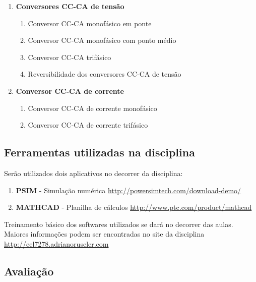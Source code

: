\documentclass[
	article,			%
	12pt,				%
	twoside,			%
	a4paper,			%
	english,			%
	brazil,				%
	sumario=tradicional
]{abntex2-modelo-plano-de-aula}
\begin{document}
\begin{enumerate}
	
	\item\textbf{Conversores CC-CA de tensão}       
	
	\begin{enumerate}
		\item Conversor CC-CA monofásico em ponte
		\item  Conversor CC-CA monofásico com ponto médio
		\item  Conversor CC-CA trifásico
		\item  Reversibilidade dos conversores CC-CA de tensão
	\end{enumerate} 
	
	\item \textbf{Conversor CC-CA de corrente}
	\begin{enumerate}
		\item  Conversor CC-CA de corrente monofásico
		\item  Conversor CC-CA de corrente trifásico
	\end{enumerate}
	
	
	
\end{enumerate} 




\begin{mdframed}[style=mdfexample2]	\center
	\section{Ferramentas utilizadas na disciplina}
\end{mdframed}        

Serão utilizados dois aplicativos no decorrer da disciplina:
\begin{enumerate}
	\item \textbf{PSIM} - Simulação numérica 
	\url{http://powersimtech.com/download-demo/}
	\item \textbf{MATHCAD} - Planilha de cálculos \url{http://www.ptc.com/product/mathcad}
\end{enumerate} 

Treinamento básico dos softwares utilizados se dará no decorrer das aulas.
Maiores informações podem ser encontradas no site da disciplina \url{http://eel7278.adrianoruseler.com} 

\begin{mdframed}[style=mdfexample2]	\center
	\section{Avaliação} %
\end{mdframed}
\end{document}
